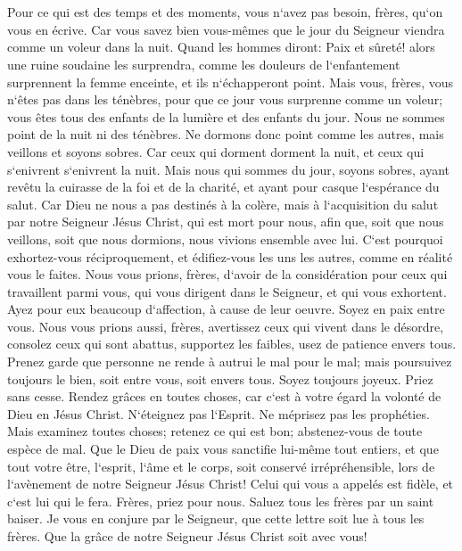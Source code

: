 \chapter{}

\verse Pour ce qui est des temps et des moments, vous n`avez pas besoin, frères, qu`on vous en écrive. 
\verse Car vous savez bien vous-mêmes que le jour du Seigneur viendra comme un voleur dans la nuit. 
\verse Quand les hommes diront: Paix et sûreté! alors une ruine soudaine les surprendra, comme les douleurs de l`enfantement surprennent la femme enceinte, et ils n`échapperont point. 
\verse Mais vous, frères, vous n`êtes pas dans les ténèbres, pour que ce jour vous surprenne comme un voleur; 
\verse vous êtes tous des enfants de la lumière et des enfants du jour. Nous ne sommes point de la nuit ni des ténèbres. 
\verse Ne dormons donc point comme les autres, mais veillons et soyons sobres. 
\verse Car ceux qui dorment dorment la nuit, et ceux qui s`enivrent s`enivrent la nuit. 
\verse Mais nous qui sommes du jour, soyons sobres, ayant revêtu la cuirasse de la foi et de la charité, et ayant pour casque l`espérance du salut. 
\verse Car Dieu ne nous a pas destinés à la colère, mais à l`acquisition du salut par notre Seigneur Jésus Christ, 
\verse qui est mort pour nous, afin que, soit que nous veillons, soit que nous dormions, nous vivions ensemble avec lui. 
\verse C`est pourquoi exhortez-vous réciproquement, et édifiez-vous les uns les autres, comme en réalité vous le faites. 
\verse Nous vous prions, frères, d`avoir de la considération pour ceux qui travaillent parmi vous, qui vous dirigent dans le Seigneur, et qui vous exhortent. 
\verse Ayez pour eux beaucoup d`affection, à cause de leur oeuvre. Soyez en paix entre vous. 
\verse Nous vous prions aussi, frères, avertissez ceux qui vivent dans le désordre, consolez ceux qui sont abattus, supportez les faibles, usez de patience envers tous. 
\verse Prenez garde que personne ne rende à autrui le mal pour le mal; mais poursuivez toujours le bien, soit entre vous, soit envers tous. 
\verse Soyez toujours joyeux. 
\verse Priez sans cesse. 
\verse Rendez grâces en toutes choses, car c`est à votre égard la volonté de Dieu en Jésus Christ. 
\verse N`éteignez pas l`Esprit. 
\verse Ne méprisez pas les prophéties. 
\verse Mais examinez toutes choses; retenez ce qui est bon; 
\verse abstenez-vous de toute espèce de mal. 
\verse Que le Dieu de paix vous sanctifie lui-même tout entiers, et que tout votre être, l`esprit, l`âme et le corps, soit conservé irrépréhensible, lors de l`avènement de notre Seigneur Jésus Christ! 
\verse Celui qui vous a appelés est fidèle, et c`est lui qui le fera. 
\verse Frères, priez pour nous. 
\verse Saluez tous les frères par un saint baiser. 
\verse Je vous en conjure par le Seigneur, que cette lettre soit lue à tous les frères. 
\verse Que la grâce de notre Seigneur Jésus Christ soit avec vous! 
